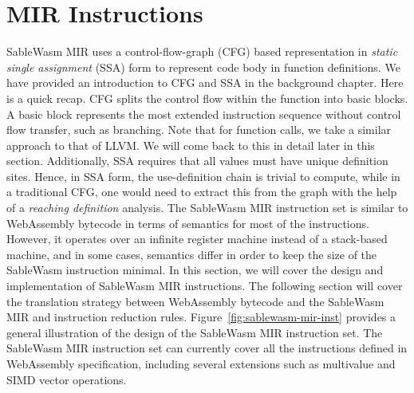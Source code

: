 \section{MIR Instructions}
\label{section:mir-design-insts}

SableWasm MIR uses a control-flow-graph (CFG) based representation in
\emph{static single assignment} (SSA) form to represent code body in function
definitions. We have provided an introduction to CFG and SSA in the background
chapter. Here is a quick recap. CFG splits the control flow within the function
into basic blocks. A basic block represents the most extended instruction
sequence without control flow transfer, such as branching. Note that for
function calls, we take a similar approach to that of LLVM. We will come back
to this in detail later in this section. Additionally, SSA requires that all
values must have unique definition sites. Hence, in SSA form, the
use-definition chain is trivial to compute, while in a traditional CFG, one
would need to extract this from the graph with the help of a \emph{reaching
  definition} analysis. The SableWasm MIR instruction set is similar to
WebAssembly bytecode in terms of semantics for most of the instructions.
However, it operates over an infinite register machine instead of a
stack-based machine, and in some cases, semantics differ in order to keep the
size of the SableWasm instruction minimal. In this section, we will cover the
design and implementation of SableWasm MIR instructions. The following section
will cover the translation strategy between WebAssembly bytecode and the
SableWasm MIR and instruction reduction rules.
Figure~\ref{fig:sablewasm-mir-inst} provides a general illustration of the
design of the SableWasm MIR instruction set. The SableWasm MIR instruction set
can currently cover all the instructions defined in WebAssembly specification,
including several extensions such as multivalue and SIMD vector operations.

